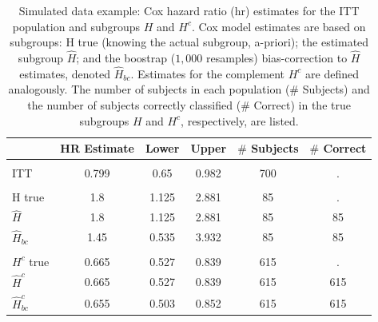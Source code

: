 \documentclass[smallextended]{svjour3}
\begin{document}
\begin{table}

\caption{\label{tab:simex1_tab}\label{tab:simex1} Simulated data example: Cox hazard ratio (hr) estimates for the ITT population and subgroups $H$ and $H^{c}$.
Cox model estimates are based on subgroups: H true (knowing the actual subgroup, a-priori); the estimated subgroup $\hat{H}$; and 
the boostrap ($1,000$ resamples) bias-correction to $\hat{H}$ estimates, denoted $\hat{H}_{bc}$.  Estimates for the complement $H^{c}$ are defined analogously.
The number of subjects in each population ($\#$ Subjects) and the number of subjects correctly classified ($\#$ Correct) in the true subgroups $H$ and $H^{c}$, respectively, are listed.}
\centering
\fontsize{9}{11}\selectfont
\begin{tabular}[t]{lccccc}
\toprule
  & HR Estimate & Lower & Upper & $\#$ Subjects & $\#$ Correct\\
\midrule
\addlinespace[0.3em]
\multicolumn{6}{l}{\textbf{ITT}}\\
\hspace{1em}ITT & 0.799 & 0.65 & 0.982 & 700 & .\\
\addlinespace[0.3em]
\multicolumn{6}{l}{\textbf{H subgroup estimates}}\\
\hspace{1em}H true & 1.8 & 1.125 & 2.881 & 85 & .\\
\hspace{1em}$\hat{H}$ & 1.8 & 1.125 & 2.881 & 85 & 85\\
\hspace{1em}$\hat{H}_{bc}$ & 1.45 & 0.535 & 3.932 & 85 & 85\\
\addlinespace[0.3em]
\multicolumn{6}{l}{\textbf{H-complement subgroup estimates}}\\
\hspace{1em}$H^{c}$ true & 0.665 & 0.527 & 0.839 & 615 & .\\
\hspace{1em}$\hat{H}^{c}$ & 0.665 & 0.527 & 0.839 & 615 & 615\\
\hspace{1em}$\hat{H}^{c}_{bc}$ & 0.655 & 0.503 & 0.852 & 615 & 615\\
\bottomrule
\end{tabular}
\end{table}





\end{document}
